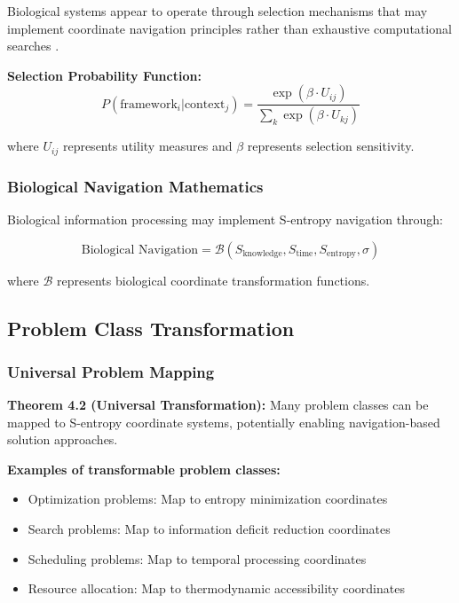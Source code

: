 \documentclass[11pt]{article}
\begin{document}
Biological systems appear to operate through selection mechanisms that may implement coordinate navigation principles rather than exhaustive computational searches \cite{friston2010free, clark2013whatever}.

\textbf{Selection Probability Function:}
\begin{equation}
P(\text{framework}_i | \text{context}_j) = \frac{\exp(\beta \cdot U_{ij})}{\sum_k \exp(\beta \cdot U_{kj})}
\label{eq:framework_selection}
\end{equation}

where $U_{ij}$ represents utility measures and $\beta$ represents selection sensitivity.

\subsubsection{Biological Navigation Mathematics}

Biological information processing may implement S-entropy navigation through:

\begin{equation}
\text{Biological Navigation} = \mathcal{B}(S_{\text{knowledge}}, S_{\text{time}}, S_{\text{entropy}}, \sigma)
\label{eq:biological_navigation}
\end{equation}

where $\mathcal{B}$ represents biological coordinate transformation functions.

\subsection{Problem Class Transformation}

\subsubsection{Universal Problem Mapping}

\textbf{Theorem 4.2 (Universal Transformation):} Many problem classes can be mapped to S-entropy coordinate systems, potentially enabling navigation-based solution approaches.

\textbf{Examples of transformable problem classes:}
\begin{itemize}
\item Optimization problems: Map to entropy minimization coordinates
\item Search problems: Map to information deficit reduction coordinates
\item Scheduling problems: Map to temporal processing coordinates
\item Resource allocation: Map to thermodynamic accessibility coordinates
\end{itemize}
\end{document}

